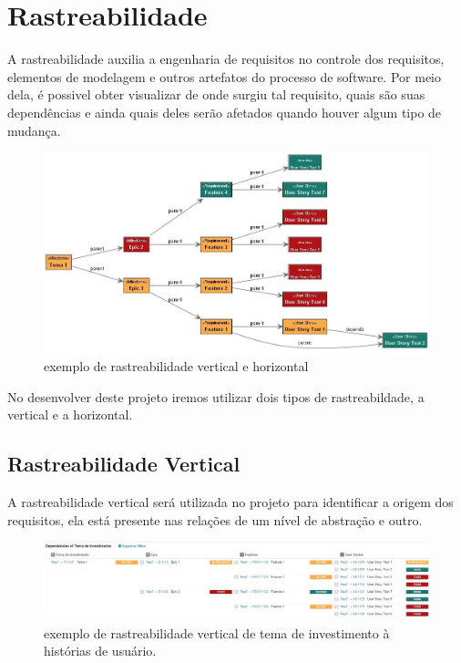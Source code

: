 \section{Rastreabilidade}
	A rastreabilidade auxilia a engenharia de requisitos no controle dos requisitos, elementos de modelagem e outros artefatos do processo de software. Por meio dela, é possivel obter visualizar de onde surgiu tal requisito, quais são suas dependências e ainda quais deles serão afetados quando houver algum tipo de mudança.\\

	\begin{figure}[!htb]
		\centering
		\includegraphics[width = \textwidth]{imagens/rastreabilidade.jpg}
		\caption{exemplo de rastreabilidade vertical e horizontal}
		\label{imagem}
	\end{figure}

	No desenvolver deste projeto iremos utilizar dois tipos de rastreabildade, a vertical e a horizontal.
	
	\subsection{Rastreabilidade Vertical}
	A rastreabilidade vertical será utilizada no projeto para identificar a origem dos requisitos, ela está presente nas relações de um nível de abstração e outro.\\

	\begin{figure}[!htb]
		\centering
		\includegraphics[width = \textwidth]{imagens/rastreabilidade_vertical.jpg}
		\caption{exemplo de rastreabilidade vertical de tema de investimento à histórias de usuário.}
		\label{imagem}
	\end{figure}

